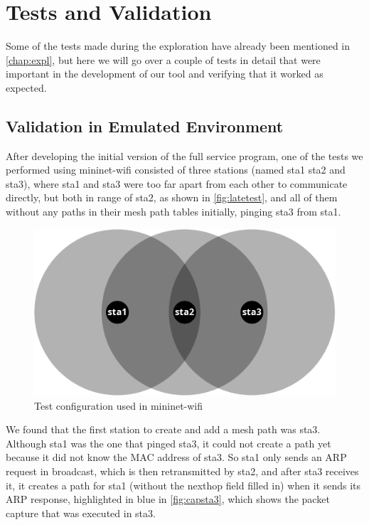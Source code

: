 \chapter{Tests and Validation}\label{chap:tests}

Some of the tests made during the exploration have already been mentioned in
\autoref{chap:expl}, but here we will go over a couple of tests in detail that
were important in the development of our tool and verifying that it worked as
expected.

\section{Validation in Emulated Environment}

After developing the initial version of the full service program, one of the
tests we performed using mininet-wifi consisted of three stations (named sta1
sta2 and sta3), where sta1 and sta3 were too far apart from each other to
communicate directly, but both in range of sta2, as shown in
\autoref{fig:latetest}, and all of them without any paths in their mesh path
tables initially, pinging sta3 from sta1.

\begin{figure}[htb]
   \centering
   \includegraphics[scale=.3]{latetest}
   \caption{Test configuration used in mininet-wifi}\label{fig:latetest}
\end{figure}

We found that the first station to create and add a mesh path was sta3. Although
sta1 was the one that pinged sta3, it could not create a path yet because it did
not know the \ac{MAC} address of sta3. So sta1 only sends an ARP request in
broadcast, which is then retransmitted by sta2, and after sta3 receives it, it
creates a path for sta1 (without the nexthop field filled in) when it sends its
ARP response, highlighted in blue in \autoref{fig:capsta3}, which shows the
packet capture that was executed in sta3.

